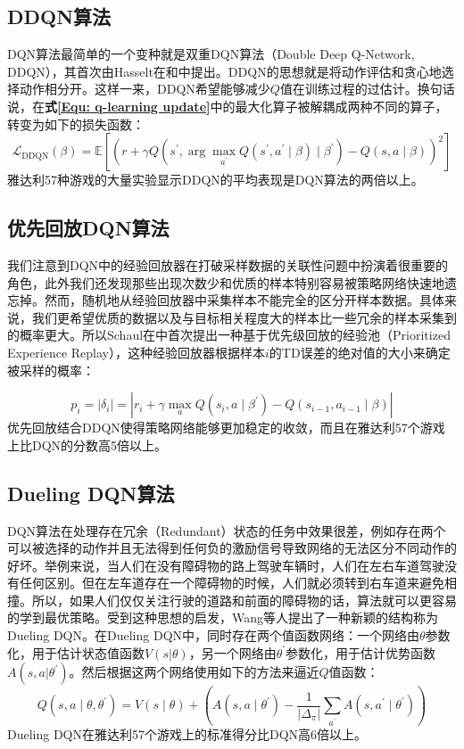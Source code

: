 \subsection{DDQN算法}
DQN算法最简单的一个变种就是双重DQN算法（Double Deep Q-Network, DDQN），其首次由Hasselt在和中提出。DDQN的思想就是将动作评估和贪心地选择动作相分开。这样一来，DDQN希望能够减少$Q$值在训练过程的过估计。换句话说，在\textbf{式\eqref{Equ: q-learning update}}中的最大化算子被解耦成两种不同的算子，转变为如下的损失函数：
\begin{equation}
    \mathcal{L}_{\mathrm{DDQN}}(\beta)=\mathbb{E}\left[\left(r+\gamma Q\left(s^{\prime}, \arg \max _{a^{\prime}} Q\left(s^{\prime}, a^{\prime} \mid \beta\right) \mid \beta^{\prime}\right)-Q(s, a \mid \beta)\right)^{2}\right]
\end{equation}
雅达利57种游戏的大量实验显示DDQN的平均表现是DQN算法的两倍以上。
\subsection{优先回放DQN算法}
我们注意到DQN中的经验回放器在打破采样数据的关联性问题中扮演着很重要的角色，此外我们还发现那些出现次数少和优质的样本特别容易被策略网络快速地遗忘掉。然而，随机地从经验回放器中采集样本不能完全的区分开样本数据。具体来说，我们更希望优质的数据以及与目标相关程度大的样本比一些冗余的样本采集到的概率更大。所以Schaul在中首次提出一种基于优先级回放的经验池（Prioritized Experience Replay），这种经验回放器根据样本$i$的TD误差的绝对值的大小来确定被采样的概率：

\begin{equation}
    p_{i}=\left|\delta_{i}\right|=\left|r_{i}+\gamma \max _{a} Q\left(s_{i}, a \mid \beta^{\prime}\right)-Q\left(s_{i-1}, a_{i-1} \mid \beta\right)\right|
\end{equation}
优先回放结合DDQN使得策略网络能够更加稳定的收敛，而且在雅达利57个游戏上比DQN的分数高5倍以上。

\subsection{Dueling DQN算法}
DQN算法在处理存在冗余（Redundant）状态的任务中效果很差，例如存在两个可以被选择的动作并且无法得到任何负的激励信号导致网络的无法区分不同动作的好坏。举例来说，当人们在没有障碍物的路上驾驶车辆时，人们在左右车道驾驶没有任何区别。但在左车道存在一个障碍物的时候，人们就必须转到右车道来避免相撞。所以，如果人们仅仅关注行驶的道路和前面的障碍物的话，算法就可以更容易的学到最优策略。受到这种思想的启发，Wang等人提出了一种新颖的结构称为Dueling DQN。在Dueling DQN中，同时存在两个值函数网络：一个网络由$\theta$参数化，用于估计状态值函数$V(s|\theta)$，另一个网络由$\theta^{\prime}$参数化，用于估计优势函数$A(s,a|\theta^{\prime})$。然后根据这两个网络使用如下的方法来逼近$Q$值函数：
\begin{equation}
    Q\left(s, a \mid \theta, \theta^{\prime}\right)=V(s \mid \theta)+\left(A\left(s, a \mid \theta^{\prime}\right)-\frac{1}{\left|\Delta_{\pi}\right|} \sum_{a^{\prime}} A\left(s, a^{\prime} \mid \theta^{\prime}\right)\right)
\end{equation}
Dueling DQN在雅达利57个游戏上的标准得分比DQN高6倍以上。

